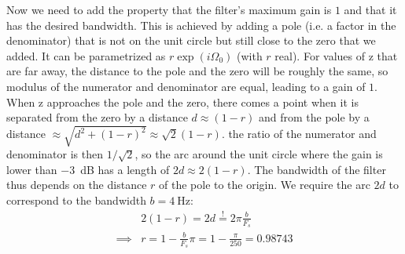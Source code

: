 \documentclass[a4paper]{scrartcl}
\begin{document}
Now we need to add the property that the filter's maximum gain is $1$ and that it has the desired bandwidth.
This is achieved by adding a pole (i.e. a factor in the denominator)
that is not on the unit circle but still close to the zero that we added.
It can be parametrized as $r \exp(i\Omega_0)$ (with $r$ real). 
For values of z that are far away, the distance to the pole and the zero will be roughly the same,
so modulus of the numerator and denominator are equal, leading to a gain of $1$.
When z approaches the pole and the zero, there comes a point when it is separated from the
zero by a distance $d \approx (1-r)$ and from the pole by a distance $\approx \sqrt{d^2+(1-r)^2} \approx \sqrt{2}(1-r)$.
the ratio of the numerator and denominator is then $1/\sqrt{2}$, so the arc around the unit circle
where the gain is lower than \SI{-3}{\dB} has a length of $2d \approx 2(1-r)$.
The bandwidth of the filter thus depends on the distance $r$ of the pole to the origin.
We require the arc $2d$ to correspond to the bandwidth $b = \SI{4}{\Hz}$:
\begin{align*}
  &2(1-r) = 2d \stackrel{!}{=} 2\pi \frac{b}{F_s}\\
  \implies &r = 1-\frac{b}{F_s}\pi = 1 - \frac{\pi}{250} = 0.98743
\end{align*}
\end{document}
